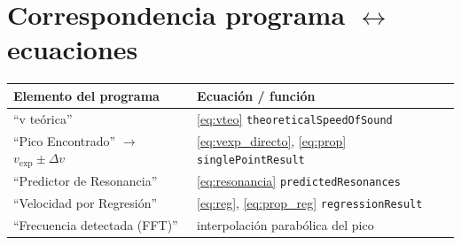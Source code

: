 \documentclass[11pt,a4paper]{article}
\newcommand{\vexp}{v_{\text{exp}}}
\begin{document}
\appendix
\section{Correspondencia programa $\leftrightarrow$ ecuaciones}
\begin{center}
\begin{tabular}{ll}
\toprule
Elemento del programa & Ecuación / función \\
\midrule
``v teórica'' & \eqref{eq:vteo} \quad\texttt{theoreticalSpeedOfSound} \\
``Pico Encontrado'' $\to$ $\vexp\pm\Delta v$ & \eqref{eq:vexp_directo}, \eqref{eq:prop} \quad\texttt{singlePointResult} \\
``Predictor de Resonancia'' & \eqref{eq:resonancia} \quad\texttt{predictedResonances} \\
``Velocidad por Regresión'' & \eqref{eq:reg}, \eqref{eq:prop_reg} \quad\texttt{regressionResult} \\
``Frecuencia detectada (FFT)'' & interpolación parabólica del pico \\
\bottomrule
\end{tabular}
\end{center}
\end{document}
